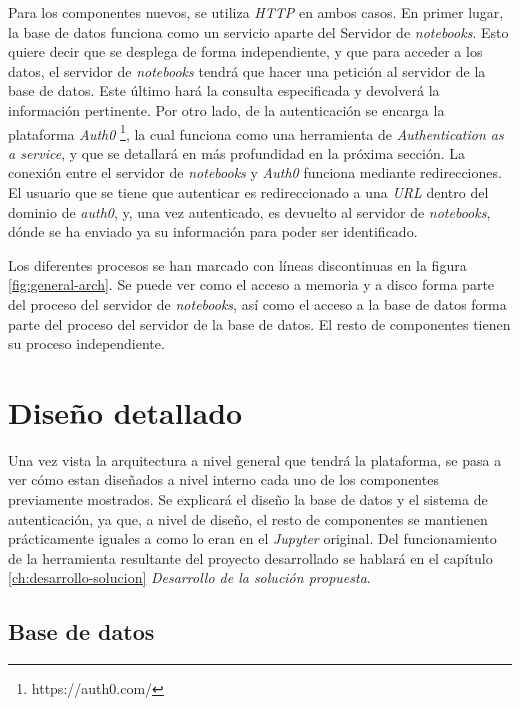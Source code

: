 \documentclass[11pt,spanish,listoffigures]{tfgetsinf}
\begin{document}
Para los componentes nuevos, se utiliza \textit{HTTP} en ambos casos. En primer lugar, la base de datos funciona como un servicio aparte del Servidor de \textit{notebooks}. Esto quiere decir que se desplega de forma independiente, y que para acceder a los datos, el servidor de \textit{notebooks} tendrá que hacer una petición al servidor de la base de datos. Este último hará la consulta especificada y devolverá la información pertinente. Por otro lado, de la autenticación se encarga la plataforma \textit{Auth0} \footnote{https://auth0.com/}, la cual funciona como una herramienta de \textit{Authentication as a service}, y que se detallará en más profundidad en la próxima sección. La conexión entre el servidor de \textit{notebooks} y \textit{Auth0} funciona mediante redirecciones. El usuario que se tiene que autenticar es redireccionado a una \textit{URL} dentro del dominio de \textit{auth0}, y, una vez autenticado, es devuelto al servidor de \textit{notebooks}, dónde se ha enviado ya su información para poder ser identificado. 

Los diferentes procesos se han marcado con líneas discontinuas en la figura \ref{fig:general-arch}. Se puede ver como el acceso a memoria y a disco forma parte del proceso del servidor de \textit{notebooks}, así como el acceso a la base de datos forma parte del proceso del servidor de la base de datos. El resto de componentes tienen su proceso independiente.



\section{Diseño detallado}
\label{sec:diseno-detallado}

Una vez vista la arquitectura a nivel general que tendrá la plataforma, se pasa a ver cómo estan diseñados a nivel interno cada uno de los componentes previamente mostrados. Se explicará  el diseño la base de datos y el sistema de autenticación, ya que, a nivel de diseño, el resto de componentes se mantienen prácticamente iguales a como lo eran en el \textit{Jupyter} original. Del funcionamiento de la herramienta resultante del proyecto desarrollado se hablará en el capítulo \ref{ch:desarrollo-solucion} \textit{Desarrollo de la solución propuesta}.


\subsection{Base de datos}
\label{subsec:diseno-bd}
\end{document}
